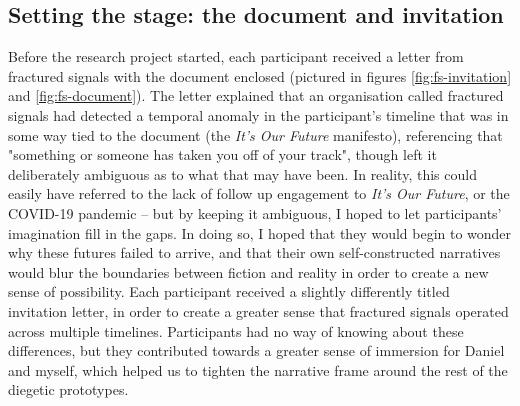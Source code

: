 \subsection{Setting the stage: the document and invitation}
\label{subsec:8-4-1-doc}
Before the research project started, each participant received a letter from fractured signals with the document enclosed  (pictured in figures \ref{fig:fs-invitation} and \ref{fig:fs-document}). The letter explained that an organisation called fractured signals had detected a temporal anomaly in the participant’s timeline that was in some way tied to the document (the \textit{It’s Our Future} manifesto), referencing that "something or someone has taken you off of your track", though left it deliberately ambiguous as to what that may have been. In reality, this could easily have referred to the lack of follow up engagement to \textit{It’s Our Future}, or the COVID-19 pandemic – but by keeping it ambiguous, I hoped to let participants’ imagination fill in the gaps. In doing so, I hoped that they would begin to wonder why these futures failed to arrive, and that their own self-constructed narratives would blur the boundaries between fiction and reality in order to create a new sense of possibility. Each participant received a slightly differently titled invitation letter, in order to create a greater sense that fractured signals operated across multiple timelines. Participants had no way of knowing about these differences, but they contributed towards a greater sense of immersion for Daniel and myself, which helped us to tighten the narrative frame around the rest of the diegetic prototypes.

